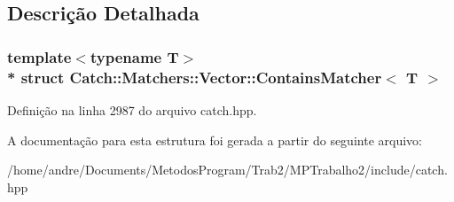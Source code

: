 \subsection{Descrição Detalhada}
\subsubsection*{template$<$typename T$>$\\*
struct Catch\+::\+Matchers\+::\+Vector\+::\+Contains\+Matcher$<$ T $>$}



Definição na linha 2987 do arquivo catch.\+hpp.



A documentação para esta estrutura foi gerada a partir do seguinte arquivo\+:\begin{DoxyCompactItemize}
\item 
/home/andre/\+Documents/\+Metodos\+Program/\+Trab2/\+M\+P\+Trabalho2/include/catch.\+hpp\end{DoxyCompactItemize}
